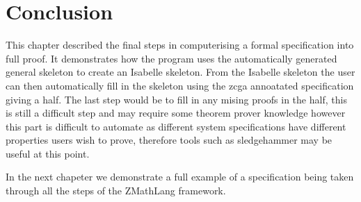 \section{Conclusion}

This chapter described the final steps in computerising a formal specification into full proof. It demonstrates how the program uses the automatically generated general skeleton to  create an Isabelle skeleton. From the Isabelle skeleton the user can then automatically fill in the skeleton using the \gls{zcga} annoatated specification giving a \gls{half}. The last step would be to fill in any mising proofs in the \gls{half}, this is still a difficult step and may require some theorem prover knowledge however this part is difficult to automate as different system specifications have different properties users wish to prove, therefore tools such as sledgehammer \cite{sledgehammer} may be useful at this point.

In the next chapeter we demonstrate a full example of a specification being taken through all the steps of the ZMathLang framework.